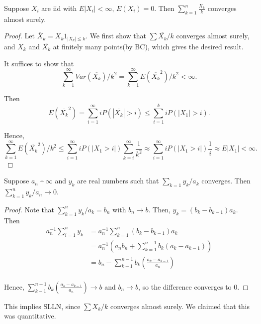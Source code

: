 \documentclass[11pt]{scrartcl}
\begin{document}
\begin{thm} Suppose $X_i$ are iid with $E|X_i| < \infty$, $E(X_i) = 0$.  Then $\sum_{k=1}^n \frac{X_k}{k}$ converges almost surely.
\end{thm}
\begin{proof}
Let $\overline{X}_k = X_k 1_{|X_k| \le k}$.  We first show that $\sum \overline{X_k}/k$ converges almost surely, and $X_k$ and $\overline{X_k}$ at finitely many points(by BC), which gives the desired result.  

It suffices to show that 
$$\sum_{k=1}^{\infty} Var(\overline{X_k})/k^2 = \sum_{k=1}^{\infty} E(\overline{X_k}^2)/k^2 < \infty.$$

Then $$E(\overline{X_k}^2) = \sum_{i=1}^{\infty} iP(|\overline{X_k}|  > i) \le \sum_{i=1}^k iP(|X_1| > i).$$

Hence,
$$\sum_{k=1}^{\infty} E(\overline{X_k}^2)/k^2 \le  \sum_{i=1}^{\infty} iP(|X_1 > i|) \sum_{k=i}^{\infty} \frac{1}{k^2} \approx \sum_{i=1}^{\infty} iP(|X_1 > i|) \frac{1}{i} \approx E|X_1| < \infty.$$
\end{proof}
\begin{lemma} Suppose $a_n \uparrow \infty$ and $y_k$ are real numbers such that 
$\sum_{k=1}y_k/a_k$ converges.  Then $\sum_{k=1}^n y_k/a_n \rightarrow 0$.  
\end{lemma}
\begin{proof}
Note that $\sum_{k=1}^n y_k/a_k = b_n$ with $b_n \rightarrow b$.  Then, $y_k = (b_k - b_{k-1})a_k$.  
Then 
\begin{align*}
a_n^{-1}\sum_{i=1}^n y_k &= a_n^{-1}\sum_{k=1}^n (b_k-b_{k-1})a_k \\
&= a_n^{-1}\left (a_nb_n +\sum_{k=1}^{n-1}b_k(a_k - a_{k-1})\right ) \\
&= b_n - \sum_{k-1}^{n-1} b_k\left ( \frac{a_k-a_{k-1}}{a_n}\right )\\
\end{align*}

Hence, $\sum_{k-1}^{n-1} b_k\left ( \frac{a_k-a_{k-1}}{a_n}\right ) \rightarrow b$ and $b_n \rightarrow b$, so the difference converges to 0.
\end{proof}
This implies SLLN, since $\sum X_k/k $ converges almost surely.  We claimed that this was quantitative.
 
\end{document}
